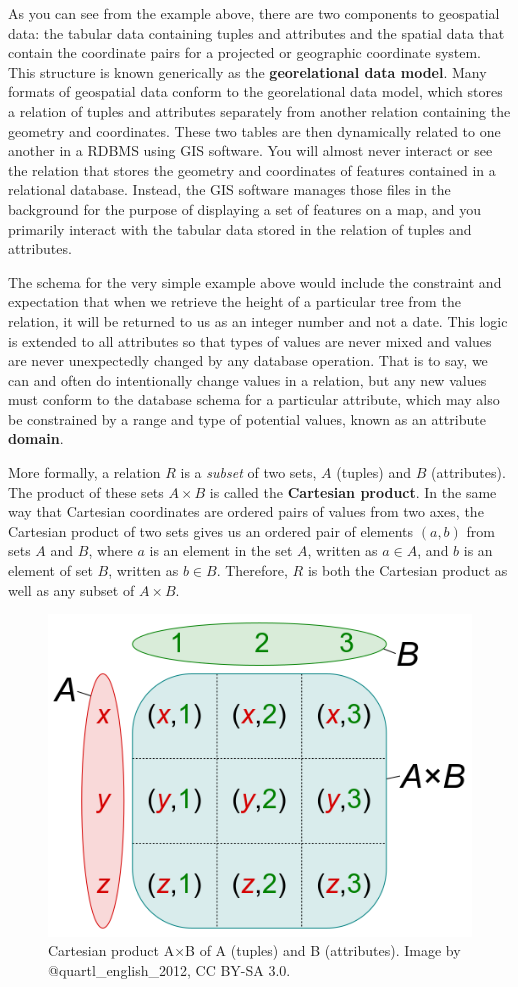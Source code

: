 \documentclass[
]{book}
\begin{document}
As you can see from the example above, there are two components to geospatial data: the tabular data containing tuples and attributes and the spatial data that contain the coordinate pairs for a projected or geographic coordinate system. This structure is known generically as the \textbf{georelational data model}. Many formats of geospatial data conform to the georelational data model, which stores a relation of tuples and attributes separately from another relation containing the geometry and coordinates. These two tables are then dynamically related to one another in a RDBMS using GIS software. You will almost never interact or see the relation that stores the geometry and coordinates of features contained in a relational database. Instead, the GIS software manages those files in the background for the purpose of displaying a set of features on a map, and you primarily interact with the tabular data stored in the relation of tuples and attributes.

The schema for the very simple example above would include the constraint and expectation that when we retrieve the height of a particular tree from the relation, it will be returned to us as an integer number and not a date. This logic is extended to all attributes so that types of values are never mixed and values are never unexpectedly changed by any database operation. That is to say, we can and often do intentionally change values in a relation, but any new values must conform to the database schema for a particular attribute, which may also be constrained by a range and type of potential values, known as an attribute \textbf{domain}.

More formally, a relation \(R\) is a \emph{subset} of two sets, \(A\) (tuples) and \(B\) (attributes). The product of these sets \(A×B\) is called the \textbf{Cartesian product}. In the same way that Cartesian coordinates are ordered pairs of values from two axes, the Cartesian product of two sets gives us an ordered pair of elements \((a,b)\) from sets \(A\) and \(B\), where \(a\) is an element in the set \(A\), written as \(a∈A\), and \(b\) is an element of set \(B\), written as \(b∈B\). Therefore, \(R\) is both the Cartesian product as well as any subset of \(A×B\).

\begin{figure}
\includegraphics[width=0.75\linewidth]{images/05-cartesian-product} \caption{Cartesian product A×B of A (tuples) and B (attributes). Image by @quartl_english_2012, CC BY-SA 3.0.}\label{fig:5-cartesian-product}
\end{figure}
\end{document}
